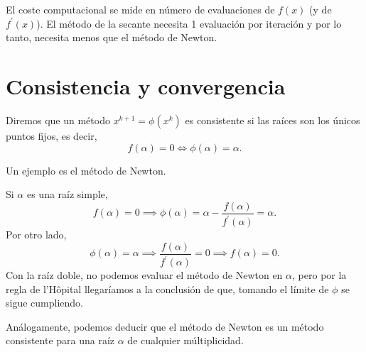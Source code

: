 \begin{center}
\end{center}

\begin{obs}
    El coste computacional se mide en número de evaluaciones de $f(x)$ (y de $f^\prime(x)$).
    El método de la secante necesita 1 evaluación por iteración y por lo tanto, necesita menos que
    el método de Newton.
\end{obs}

\section{Consistencia y convergencia}

\begin{defi}
    Diremos que un método $x^{k+1} = \phi\left( x^k \right)$ es consistente si las raíces son
    los únicos puntos fijos, es decir,
    \[
        f(\alpha) = 0 \iff \phi(\alpha) = \alpha.
    \]
\end{defi}

\begin{ej}
    Un ejemplo es el método de Newton.

    Si $\alpha$ es una raíz simple,
    \[
        f(\alpha) = 0 \implies \phi(\alpha) = \alpha - \frac{f(\alpha)}{f^\prime(\alpha)} = \alpha.
    \]
    Por otro lado,
    \[
        \phi(\alpha) = \alpha \implies \frac{f(\alpha)}{f^\prime(\alpha)} = 0 \implies f(\alpha) = 0.
    \]
    Con la raíz doble, no podemos evaluar el método de Newton en $\alpha$, pero por la regla de l'Hôpital llegaríamos
    a la conclusión de que, tomando el límite de $\phi$ se sigue cumpliendo.

    Análogamente, podemos deducir que el método de Newton es un método consistente para una raíz $\alpha$ de
    cualquier múltiplicidad.
\end{ej}

